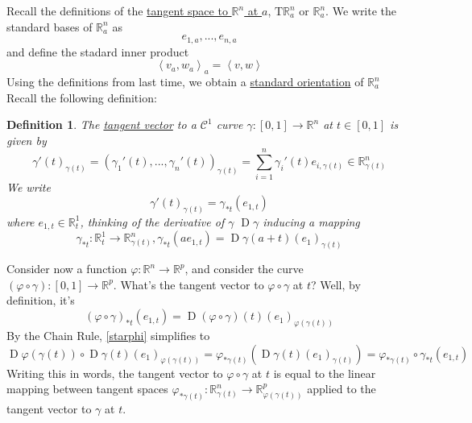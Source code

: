 \documentclass{article}
\newtheorem{definition}{Definition}
\DeclareMathOperator{\D}{D}
\newcommand{\reals}[0]{\mathbb{R}}
\newcommand{\mc}[1]{\mathcal{#1}}
\newcommand{\ip}[2]{\left\langle#1,#2\right\rangle}
\begin{document}
Recall the definitions of the \underline{tangent space to \(\reals^n\) at \(a\)}, \(\text{T}\reals^n_a\) or \(\reals^n_a\). We write the standard bases of \(\reals^n_a\) as
\begin{equation}
  e_{1,a},...,e_{n,a}
\end{equation}
and define the stadard inner product
\begin{equation}
  \ip{v_a}{w_a}_a = \ip{v}{w}
\end{equation}
Using the definitions from last time, we obtain a \underline{standard orientation} of \(\reals^n_a\)
\begin{equation}
  [e_{1,a},...,e_{n,a}]
\end{equation}
Recall the following definition:
\begin{definition}
  The \underline{tangent vector} to a \(\mc{C}^1\) curve \(\gamma: [0, 1] \to \reals^n\) at \(t \in [0, 1]\) is given by
  \begin{equation}
    \gamma'(t)_{\gamma(t)} = (\gamma_1'(t),...,\gamma_n'(t))_{\gamma(t)} = \sum_{i = 1}^n\gamma_i'(t)e_{i, \gamma(t)} \in \reals^n_{\gamma(t)}
  \end{equation}
  We write
  \begin{equation}
    \gamma'(t)_{\gamma(t)} = \gamma_{*t}(e_{1, t})
  \end{equation}
  where \(e_{1, t} \in \reals^1_t\), thinking of the derivative of \(\gamma\) \(\D\gamma\) inducing a mapping
  \begin{equation}
    \gamma_{*t}: \reals_t^1 \to \reals^n_{\gamma(t)}, \gamma_{*t}(ae_{1, t}) = \D\gamma(a + t)(e_1)_{\gamma(t)}
  \end{equation}
\end{definition}
Consider now a function \(\varphi : \reals^n \to \reals^p\), and consider the curve \((\varphi \circ \gamma): [0, 1] \to \reals^p\). What's the tangent vector to \(\varphi \circ \gamma\) at \(t\)? Well, by definition, it's
\begin{equation}
  (\varphi \circ \gamma)_{*t}(e_{1, t}) = \D(\varphi \circ \gamma)(t)(e_1)_{\varphi(\gamma(t))} \label{starphi}
\end{equation}
By the Chain Rule, \ref{starphi} simplifies to
\begin{equation}
  \D\varphi(\gamma(t)) \circ \D\gamma(t) (e_1)_{\varphi(\gamma(t))} = \varphi_{*\gamma(t)}(\D\gamma(t)(e_1)_{\gamma(t)}) = \varphi_{*\gamma(t)} \circ \gamma_{*t}(e_{1, t})
\end{equation}
Writing this in words, the tangent vector to \(\varphi \circ \gamma\) at \(t\) is equal to the linear mapping between tangent spaces \(\varphi_{*\gamma(t)}: \reals^n_{\gamma(t)} \to \reals^p_{\varphi(\gamma(t))}\) applied to the tangent vector to \(\gamma\) at \(t\).
\end{document}
